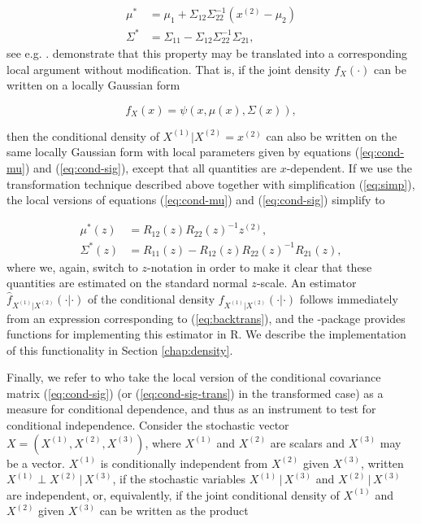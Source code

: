 \begin{align}
\mu^* &= \mu_1 + \Sigma_{12}\Sigma_{22}^{-1}\left(x^{(2)} - \mu_2\right) \label{eq:cond-mu} \\
\Sigma^* &= \Sigma_{11} - \Sigma_{12}\Sigma_{22}^{-1}\Sigma_{21}, \label{eq:cond-sig}
\end{align}
see e.g. \citet[chapter 4]{john:wich:2007}. \citet{otne:tjos:2018} demonstrate that this property may be translated into a corresponding local argument without modification. That is, if the joint density $f_X(\cdot)$ can be written on a locally Gaussian form 

$$f_X(x) = \psi(x, \mu(x), \Sigma(x)),$$

then the conditional density of $X^{(1)}|X^{(2)} = x^{(2)}$ can also be written on the same locally Gaussian form with local parameters given by equations (\ref{eq:cond-mu}) and (\ref{eq:cond-sig}), except that all quantities are $x$-dependent. If we use the transformation technique described above together with simplification (\ref{eq:simp}), the local versions of equations (\ref{eq:cond-mu}) and (\ref{eq:cond-sig}) simplify to

\begin{align}
\mu^*(z) &= R_{12}(z)R_{22}(z)^{-1}z^{(2)},  \label{eq:cond-mu-trans}\\
\Sigma^*(z) &= R_{11}(z) - R_{12}(z)R_{22}(z)^{-1}R_{21}(z), \label{eq:cond-sig-trans}
\end{align}
where we, again, switch to $z$-notation in order to make it clear that these quantities are estimated on the standard normal $z$-scale. An estimator $\widehat f_{X^{(1)}|X^{(2)}}(\cdot|\cdot)$ of the conditional density $f_{X^{(1)}|X^{(2)}}(\cdot|\cdot)$ follows immediately from an expression corresponding to (\ref{eq:backtrans}), and the -package provides functions for implementing this estimator in R. We describe the implementation of this functionality in Section \ref{chap:density}.

Finally, we refer to \citet{otne:tjos:2019} who take the local version of the conditional covariance matrix (\ref{eq:cond-sig}) (or (\ref{eq:cond-sig-trans}) in the transformed case) as a measure for conditional dependence, and thus as an instrument to test for conditional independence. Consider the stochastic vector $X = \left(X^{(1)}, X^{(2)}, X^{(3)}\right)$, where $X^{(1)}$ and $X^{(2)}$ are scalars and $X^{(3)}$ may be a vector. $X^{(1)}$ is conditionally independent from $X^{(2)}$ given $X^{(3)}$, written $X^{(1)} \perp X^{(2)} \,|\,X^{(3)}$, if the stochastic variables $X^{(1)}\,|\,X^{(3)}$ and $X^{(2)}\,|\,X^{(3)}$ are independent, or, equivalently, if the joint conditional density of $X^{(1)}$ and $X^{(2)}$ given $X^{(3)}$ can be written as the product

